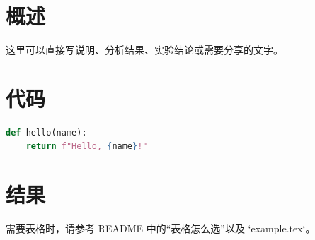 \documentclass[12pt,a4paper]{scrartcl}
\begin{document}
\makedocumenttitle

\section{概述}

这里可以直接写说明、分析结果、实验结论或需要分享的文字。

\section{代码}

\begin{lstlisting}[language=Python]
def hello(name):
    return f"Hello, {name}!"
\end{lstlisting}

\section{结果}

需要表格时，请参考 README 中的“表格怎么选”以及 `example.tex`。
\end{document}
